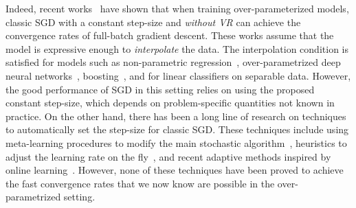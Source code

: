 Indeed, recent works~\cite{vaswani2019fast,ma2018power,bassily2018exponential,liu2018mass, cevher2018linear, jain2017accelerating, schmidt2013fast} have shown that when training over-parameterized models, classic SGD with a constant step-size and \emph{without VR} can achieve the convergence rates of full-batch gradient descent. These works assume that the model is expressive enough to \emph{interpolate} the data. The interpolation condition is satisfied for models such as non-parametric regression~\cite{liang2018just,belkin2019does}, over-parametrized deep neural networks~\cite{zhang2016understanding}, boosting~\cite{schapire1998boosting}, and for linear classifiers on separable data. However, the good performance of SGD in this setting relies on using the proposed constant step-size, which depends on problem-specific quantities not known in practice. On the other hand, there has been a long line of research on techniques to automatically set the step-size for classic SGD. These techniques include using meta-learning procedures to modify the main stochastic algorithm~\cite{baydin2017online,yu2006fast,schraudolph1999local,almeida1998parameter,plagianakos2001learning,yu2006fast,shao2000rates}, heuristics to adjust the learning rate on the fly~\cite{kushner1995stochastic, deylon1993accelerated, schaul2013no, schoenauer2017stochastic}, and recent adaptive methods inspired by online learning~\cite{duchi2011adaptive,zeiler2012adadelta,kingma2014adam,reddi2019convergence, orabona2017training,rolinek2018l4, luo2019adaptive}. However, none of these techniques have been proved to achieve the fast convergence rates that we now know are possible in the over-parametrized setting.

